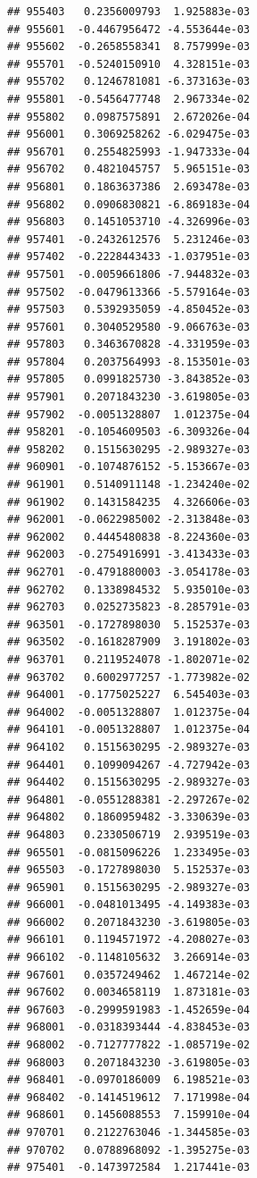\documentclass[ignorenonframetext,]{beamer}
\begin{document}
\begin{frame}[fragile]
\begin{verbatim}
## 955403   0.2356009793  1.925883e-03
## 955601  -0.4467956472 -4.553644e-03
## 955602  -0.2658558341  8.757999e-03
## 955701  -0.5240150910  4.328151e-03
## 955702   0.1246781081 -6.373163e-03
## 955801  -0.5456477748  2.967334e-02
## 955802   0.0987575891  2.672026e-04
## 956001   0.3069258262 -6.029475e-03
## 956701   0.2554825993 -1.947333e-04
## 956702   0.4821045757  5.965151e-03
## 956801   0.1863637386  2.693478e-03
## 956802   0.0906830821 -6.869183e-04
## 956803   0.1451053710 -4.326996e-03
## 957401  -0.2432612576  5.231246e-03
## 957402  -0.2228443433 -1.037951e-03
## 957501  -0.0059661806 -7.944832e-03
## 957502  -0.0479613366 -5.579164e-03
## 957503   0.5392935059 -4.850452e-03
## 957601   0.3040529580 -9.066763e-03
## 957803   0.3463670828 -4.331959e-03
## 957804   0.2037564993 -8.153501e-03
## 957805   0.0991825730 -3.843852e-03
## 957901   0.2071843230 -3.619805e-03
## 957902  -0.0051328807  1.012375e-04
## 958201  -0.1054609503 -6.309326e-04
## 958202   0.1515630295 -2.989327e-03
## 960901  -0.1074876152 -5.153667e-03
## 961901   0.5140911148 -1.234240e-02
## 961902   0.1431584235  4.326606e-03
## 962001  -0.0622985002 -2.313848e-03
## 962002   0.4445480838 -8.224360e-03
## 962003  -0.2754916991 -3.413433e-03
## 962701  -0.4791880003 -3.054178e-03
## 962702   0.1338984532  5.935010e-03
## 962703   0.0252735823 -8.285791e-03
## 963501  -0.1727898030  5.152537e-03
## 963502  -0.1618287909  3.191802e-03
## 963701   0.2119524078 -1.802071e-02
## 963702   0.6002977257 -1.773982e-02
## 964001  -0.1775025227  6.545403e-03
## 964002  -0.0051328807  1.012375e-04
## 964101  -0.0051328807  1.012375e-04
## 964102   0.1515630295 -2.989327e-03
## 964401   0.1099094267 -4.727942e-03
## 964402   0.1515630295 -2.989327e-03
## 964801  -0.0551288381 -2.297267e-02
## 964802   0.1860959482 -3.330639e-03
## 964803   0.2330506719  2.939519e-03
## 965501  -0.0815096226  1.233495e-03
## 965503  -0.1727898030  5.152537e-03
## 965901   0.1515630295 -2.989327e-03
## 966001  -0.0481013495 -4.149383e-03
## 966002   0.2071843230 -3.619805e-03
## 966101   0.1194571972 -4.208027e-03
## 966102  -0.1148105632  3.266914e-03
## 967601   0.0357249462  1.467214e-02
## 967602   0.0034658119  1.873181e-03
## 967603  -0.2999591983 -1.452659e-04
## 968001  -0.0318393444 -4.838453e-03
## 968002  -0.7127777822 -1.085719e-02
## 968003   0.2071843230 -3.619805e-03
## 968401  -0.0970186009  6.198521e-03
## 968402  -0.1414519612  7.171998e-04
## 968601   0.1456088553  7.159910e-04
## 970701   0.2122763046 -1.344585e-03
## 970702   0.0788968092 -1.395275e-03
## 975401  -0.1473972584  1.217441e-03

\end{verbatim}
\end{frame}
\end{document}
